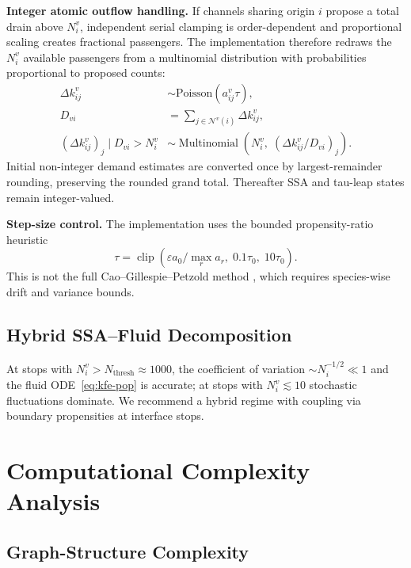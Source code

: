 \documentclass[12pt,a4paper]{article}
\theoremstyle{plain}
\theoremstyle{definition}
\theoremstyle{remark}
\begin{document}
\textbf{Integer atomic outflow handling.} If channels sharing origin $i$
propose a total drain above $N_i^v$, independent serial clamping is
order-dependent and proportional scaling creates fractional passengers.  The
implementation therefore redraws the $N_i^v$ available passengers from a
multinomial distribution with probabilities proportional to proposed counts:
\begin{align}
  \Delta k^v_{ij} &\sim \mathrm{Poisson}(a^v_{ij}\tau), \label{eq:draw}\\
  D_{vi} &= \textstyle\sum_{j\in\mathcal{N}^v(i)}\Delta k^v_{ij},
    \label{eq:total-out}\\
  (\Delta k^v_{ij})_j \mid D_{vi}>N_i^v
  &\sim \operatorname{Multinomial}\!\left(
  N_i^v,\;(\Delta k^v_{ij}/D_{vi})_j\right).
\end{align}
Initial non-integer demand estimates are converted once by largest-remainder
rounding, preserving the rounded grand total.  Thereafter SSA and tau-leap
states remain integer-valued.

\textbf{Step-size control.}
The implementation uses the bounded propensity-ratio heuristic
\begin{equation}
  \tau = \operatorname{clip}\!\left(
    \varepsilon a_0/\max_r a_r,\;0.1\tau_0,\;10\tau_0\right).
\end{equation}
This is not the full Cao--Gillespie--Petzold method \citep{cao2006}, which
requires species-wise drift and variance bounds.

\subsection{Hybrid SSA--Fluid Decomposition}

At stops with $N^v_i>N_{\mathrm{thresh}}\approx1000$, the coefficient of
variation $\sim N_i^{-1/2}\ll1$ and the fluid ODE~\eqref{eq:kfe-pop} is
accurate; at stops with $N^v_i\lesssim10$ stochastic fluctuations dominate.
We recommend a hybrid regime with coupling via boundary propensities at
interface stops.

\section{Computational Complexity Analysis}
\label{sec:complexity}

\subsection{Graph-Structure Complexity}
\end{document}

